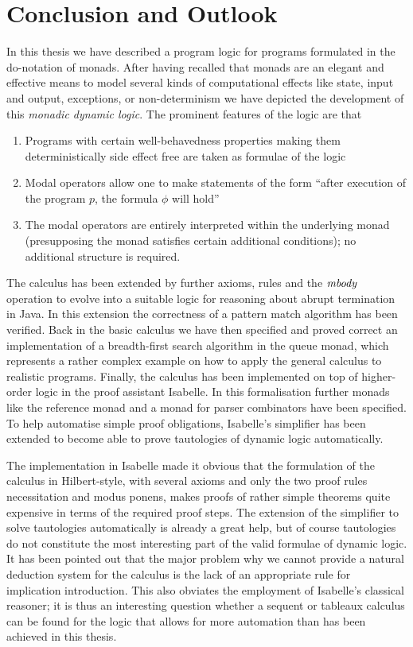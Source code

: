 
\chapter{Conclusion and Outlook}
\label{cha:outlook}


In this thesis we have described a program logic for programs formulated in the
do-notation of monads. After having recalled that monads are an elegant and
effective means to model several kinds of computational effects like state,
input and output, exceptions, or non-determinism we have depicted the
development of this \emph{monadic dynamic logic}. The prominent features of the
logic are that
\begin{enumerate}
  \item Programs with certain well-behavedness properties making them
    deterministically side effect free are taken as formulae
    of the logic
  \item Modal operators allow one to make statements of the form ``after
    execution of the program $p$, the formula $\phi$ will hold''
  \item The modal operators are entirely interpreted within the underlying monad
    (presupposing the monad satisfies certain additional conditions); no
    additional structure is required.
\end{enumerate}
The calculus has been extended by further axioms, rules and the $\mathit{mbody}$
operation to evolve into a suitable logic for reasoning about abrupt termination
in Java. In this extension the correctness of a pattern match algorithm has been
verified. Back in the basic calculus we have then specified and proved correct an
implementation of a breadth-first search algorithm in the queue monad, which
represents a rather complex example on how to apply the general calculus to
realistic programs.  Finally, the calculus has been implemented on top of
higher-order logic in the proof assistant Isabelle.  In this formalisation
further monads like the reference monad and a monad for parser combinators have
been specified. To help automatise simple proof obligations, Isabelle's
simplifier has been extended to become able to prove tautologies of dynamic
logic automatically.


The implementation in Isabelle made it obvious that the formulation of the
calculus in Hilbert-style, \IE with several axioms and only the two proof rules
necessitation and modus ponens, makes proofs of rather simple theorems quite
expensive in terms of the required proof steps. The extension of the simplifier
to solve tautologies automatically is already a great help, but of course
tautologies do not constitute the most interesting part of the valid formulae of
dynamic logic. It has been pointed out that the major problem why we cannot
provide a natural deduction system for the calculus is the lack of an
appropriate rule for implication introduction. This also obviates the employment
of Isabelle's classical reasoner; it is thus an interesting question whether a
sequent or tableaux calculus can be found for the logic that allows for more
automation than has been achieved in this thesis.

